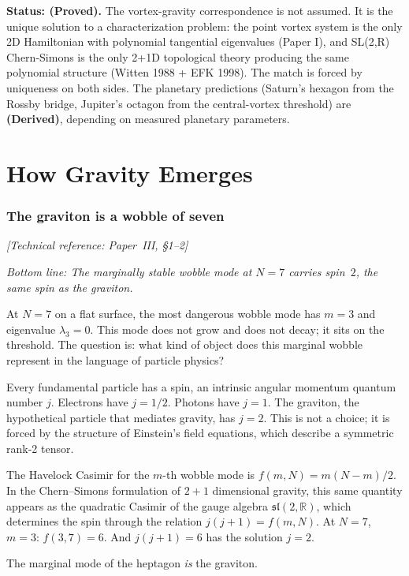 \textbf{Status: (Proved).} The vortex-gravity correspondence
is not assumed. It is the unique solution to a characterization
problem: the point vortex system is the only 2D Hamiltonian with
polynomial tangential eigenvalues (Paper I), and SL(2,R)
Chern-Simons is the only 2+1D topological theory producing
the same polynomial structure (Witten 1988 + EFK 1998).
The match is forced by uniqueness on both sides.
The planetary predictions (Saturn's hexagon from the Rossby bridge,
Jupiter's octagon from the central-vortex threshold) are
\textbf{(Derived)}, depending on measured planetary parameters.


\part{How Gravity Emerges}


\section{The graviton is a wobble of seven}
\noindent\textit{[Technical reference: Paper~III, \S1--2]}

\medskip

\noindent\textit{Bottom line: The marginally stable wobble mode at
$N = 7$ carries spin~$2$, the same spin as the graviton.}

\medskip

At $N = 7$ on a flat surface, the most dangerous wobble mode has
$m = 3$ and eigenvalue $\lambda_3 = 0$. This mode does not grow and
does not decay; it sits on the threshold. The question is: what kind
of object does this marginal wobble represent in the language of
particle physics?

Every fundamental particle has a spin, an intrinsic angular momentum
quantum number $j$. Electrons have $j = 1/2$. Photons have $j = 1$.
The graviton, the hypothetical particle that mediates gravity, has
$j = 2$. This is not a choice; it is forced by the structure of
Einstein's field equations, which describe a symmetric rank-2 tensor.

The Havelock Casimir for the $m$-th wobble mode is $f(m, N) = m(N-m)/2$.
In the Chern--Simons formulation of $2{+}1$ dimensional gravity, this
same quantity appears as the quadratic Casimir of the gauge algebra
$\mathfrak{sl}(2, \mathbb{R})$, which determines the spin through the
relation $j(j+1) = f(m, N)$. At $N = 7$, $m = 3$: $f(3, 7) = 6$. And
$j(j+1) = 6$ has the solution $j = 2$.

The marginal mode of the heptagon \emph{is} the graviton.

